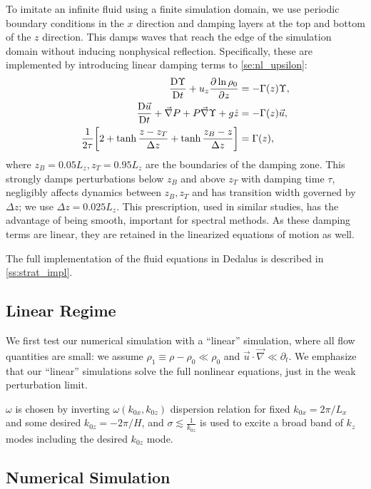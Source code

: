 \documentclass[twocolumn,
        nofootinbib, %
        usenames, %
        aps,
        prd,
        dvipsnames %
    ]{revtex4-1}%
\newcommand*{\pd}[2]{\frac{\partial#1}{\partial#2}}
\newcommand*{\md}[2]{\frac{\mathrm{D}#1}{\mathrm{D}#2}}
\DeclarePairedDelimiter\s{\lbrack}{\rbrack}
\begin{document}
To imitate an infinite fluid using a finite simulation domain, we use periodic
boundary conditions in the $x$ direction and damping layers at the top and
bottom of the $z$ direction. This damps waves that reach the edge of the
simulation domain without inducing nonphysical reflection. Specifically, these
are implemented by introducing linear damping terms to \autoref{se:nl_upsilon}:
\begin{align}
    \md{\Upsilon}{t} + u_z \pd{\ln \rho_0}{z} &=
        -\Gamma(z)\Upsilon,\nonumber\\
    \md{\vec{u}}{t} + \vec{\nabla}P + P\vec{\nabla}\Upsilon + g\hat{z} &=
        - \Gamma(z)\vec{u},\nonumber\\
    \frac{1}{2\tau}\s*{2 + \tanh \frac{z - z_T}{\Delta z}
        + \tanh \frac{z_B - z}{\Delta z}} &= \Gamma(z),\label{eq:Gamma}
\end{align}
where $z_B = 0.05L_z, z_T = 0.95L_z$ are the boundaries of the damping zone.
This strongly damps perturbations below $z_B$ and above $z_T$ with damping time
$\tau$, negligibly affects dynamics between $z_B, z_T$ and has transition width
governed by $\Delta z$; we use $\Delta z = 0.025L_z$. This prescription, used in
similar studies\cite{lecoanet_damp}, has the advantage of being smooth,
important for spectral methods. As these damping terms are linear, they are
retained in the linearized equations of motion as well.

The full implementation of the fluid equations in Dedalus is described in
\autoref{ss:strat_impl}.

\subsection{Linear Regime}\label{ss:lin}

We first test our numerical simulation with a ``linear'' simulation, where
all flow quantities are small: we assume  $\rho_1 \equiv \rho - \rho_0 \ll
\rho_0$ and $\vec{u} \cdot \vec{\nabla} \ll \partial_t$. We emphasize that our
``linear'' simulations solve the full nonlinear equations, just in the weak
perturbation limit.

$\omega$ is chosen by inverting $\omega(k_{0x}, k_{0z})$ dispersion relation for fixed
$k_{0x} = 2\pi / L_x$ and some desired $k_{0z} = -2\pi/H$, and $\sigma \lesssim
\frac{1}{k_{0z}}$ is used to excite a broad band of $k_z$ modes including the
desired $k_{0z}$ mode.

\subsection{Numerical Simulation}\label{ss:lin_ns}
\end{document}
